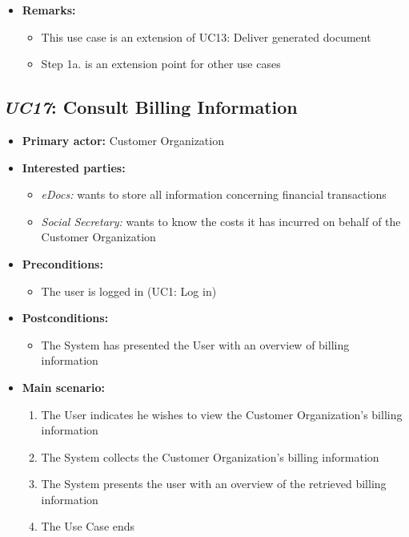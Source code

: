 \documentclass[a4paper,10pt]{article}
\begin{document}
\begin{itemize}
    \item \textbf{Remarks:}
        \begin{itemize}
          \item This use case is an extension of UC13: Deliver generated document
          \item Step 1a. is an extension point for other use cases
        \end{itemize}
\end{itemize}

\subsection{\emph{UC17}: Consult Billing Information}
\begin{itemize}
	\item \textbf{Primary actor:} Customer Organization
	\item \textbf{Interested parties:} 
	\begin{itemize}
		\item \textit{eDocs:} wants to store all information concerning financial transactions
		\item \textit{Social Secretary:} wants to know the costs it has incurred on behalf of the Customer Organization
	\end{itemize}
	
	\item \textbf{Preconditions:}
	\begin{itemize}
		\item The user is logged in (UC1: Log in)
	\end{itemize}
	
	\item \textbf{Postconditions:}
	\begin{itemize}
		\item The System has presented the User with an overview of billing information
	\end{itemize}
	
	\item \textbf{Main scenario:} 
	\begin{enumerate}
		\item The User indicates he wishes to view the Customer Organization's billing information
		\item The System collects the Customer Organization's billing information
		\item The System presents the user with an overview of the retrieved billing information
		\item The Use Case ends
	\end{enumerate}
	

\end{itemize}
\end{document}
